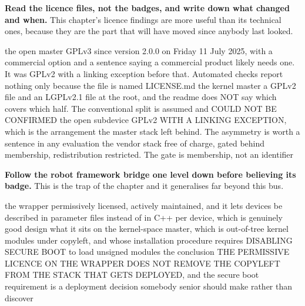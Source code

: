\begin{steps}
\item \textbf{Read the licence files, not the badges, and write down what
changed and when.} This chapter's licence findings are more useful than its
technical ones, because they are the part that will have moved since anybody
last looked.
\begin{plaincode}
the open master     GPLv3 since version 2.0.0 on Friday 11 July 2025, with a
                    commercial option and a sentence saying a commercial
                    product likely needs one. It was GPLv2 with a linking
                    exception before that. Automated checks report nothing
                    only because the file is named LICENSE.md
the kernel master   a GPLv2 file and an LGPLv2.1 file at the root, and the
                    readme does NOT say which covers which half. The
                    conventional split is assumed and COULD NOT BE CONFIRMED
the open subdevice  GPLv2 WITH A LINKING EXCEPTION, which is the arrangement
                    the master stack left behind. The asymmetry is worth a
                    sentence in any evaluation
the vendor stack    free of charge, gated behind membership, redistribution
                    restricted. The gate is membership, not an identifier
\end{plaincode}

\item \textbf{Follow the robot framework bridge one level down before believing
its badge.} This is the trap of the chapter and it generalises far beyond this
bus.
\begin{plaincode}
the wrapper        permissively licensed, actively maintained, and it lets
                   devices be described in parameter files instead of in
                   C++ per device, which is genuinely good design
what it sits on    the kernel-space master, which is out-of-tree kernel
                   modules under copyleft, and whose installation procedure
                   requires DISABLING SECURE BOOT to load unsigned modules
the conclusion     THE PERMISSIVE LICENCE ON THE WRAPPER DOES NOT REMOVE THE
                   COPYLEFT FROM THE STACK THAT GETS DEPLOYED, and the
                   secure boot requirement is a deployment decision somebody
                   senior should make rather than discover
\end{plaincode}


\end{steps}
